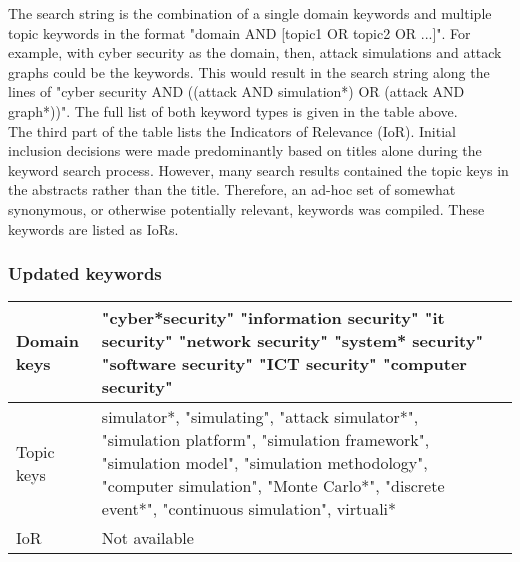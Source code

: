 \documentclass{article}
\begin{document}

\noindent The search string is the combination of a single domain keywords and multiple topic keywords in the format "domain AND [topic1 OR topic2 OR ...]". For example, with cyber security as the domain, then, attack simulations and attack graphs could be the keywords. This would result in the search string along the lines of "cyber security AND ((attack AND simulation*) OR (attack AND graph*))". The full list of both keyword types is given in the table above.\\

\noindent The third part of the table lists the Indicators of Relevance (IoR). Initial inclusion decisions were made predominantly based on titles alone during the keyword search process. However, many search results contained the topic keys in the abstracts rather than the title. Therefore, an ad-hoc set of somewhat synonymous, or otherwise potentially relevant, keywords was compiled. These keywords are listed as IoRs.


\subsubsection{Updated keywords}

\begin{center}
\begin{tabular}{ | m{1.2cm} | m{28em}| m{1.5cm} | }
\hline
Domain keys & "cyber*security" "information security" "it security" "network security" "system* security" "software security" "ICT security" "computer security"\\
\hline
Topic keys & simulator*, "simulating", "attack simulator*", "simulation platform", "simulation framework", "simulation model", "simulation methodology", "computer simulation", "Monte Carlo*", "discrete event*", "continuous simulation", virtuali*\\
\hline
IoR & Not available\\
\hline
\end{tabular}
\end{center}
\end{document}
